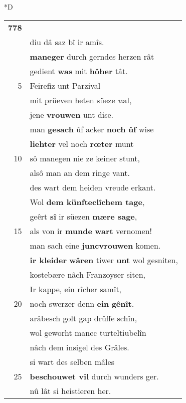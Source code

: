 \documentclass[8pt,a4paper,notitlepage]{article}
\begin{document}
\begin{table}[ht]
\begin{minipage}[t]{0.5\linewidth}
\small
\begin{center}*D
\end{center}
\begin{tabular}{rl}
\textbf{778} & \textit{\begin{large}I\end{large}}eslîch vrouwe hete prîs,\\ 
 & diu dâ saz bî ir amîs.\\ 
 & \textbf{maneger} durch gerndes herzen rât\\ 
 & gedient \textbf{was} mit \textbf{hôher} tât.\\ 
5 & Feirefiz unt Parzival\\ 
 & mit prüeven heten süeze \textit{w}al,\\ 
 & jene \textbf{vrouwen} unt dise.\\ 
 & man \textbf{gesach} ûf acker \textbf{noch} \textbf{ûf} wise\\ 
 & \textbf{liehter} vel noch \textbf{rœter} munt\\ 
10 & sô manegen nie ze keiner stunt,\\ 
 & alsô man an dem ringe vant.\\ 
 & des wart dem heiden vreude erkant.\\ 
 & Wol \textbf{dem künfteclîchem tage},\\ 
 & geêrt \textbf{sî} ir süezen \textbf{mære sage},\\ 
15 & als von ir \textbf{munde} \textbf{wart} vernomen!\\ 
 & man sach eine \textbf{juncvrouwen} komen.\\ 
 & \textbf{ir kleider} \textbf{wâren} tiwer \textbf{unt} wol gesniten,\\ 
 & kostebære nâch Franzoyser siten,\\ 
 & Ir kappe, ein rîcher samît,\\ 
20 & noch swerzer denn \textbf{ein} \textbf{gênît}.\\ 
 & arâbesch golt gap drûffe schîn,\\ 
 & wol geworht manec turteltiubelîn\\ 
 & nâch dem insigel des Grâles.\\ 
 & si wart des selben mâles\\ 
25 & \textbf{beschouwet vil} durch wunders ger.\\ 
 & nû lât si heistieren her.\\ 

\end{tabular}
\end{minipage}
\end{table}
\end{document}
